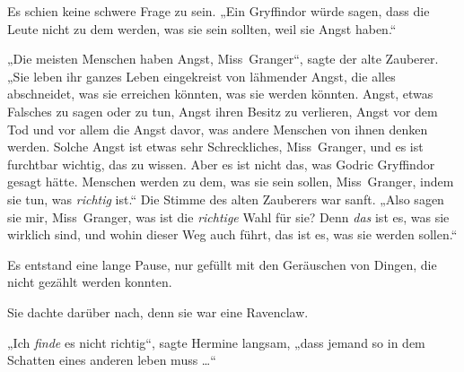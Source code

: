 Es schien keine schwere Frage zu sein.
„Ein Gryffindor würde sagen, dass die Leute nicht zu dem werden, was sie sein sollten, weil sie Angst haben.“

„Die meisten Menschen haben Angst, Miss~Granger“, sagte der alte Zauberer.
„Sie leben ihr ganzes Leben eingekreist von lähmender Angst, die alles abschneidet, was sie erreichen könnten, was sie werden könnten. Angst, etwas Falsches zu sagen oder zu tun, Angst ihren Besitz zu verlieren, Angst vor dem Tod und vor allem die Angst davor, was andere Menschen von ihnen denken werden. Solche Angst ist etwas sehr Schreckliches, Miss~Granger, und es ist furchtbar wichtig, das zu wissen. Aber es ist nicht das, was Godric Gryffindor gesagt hätte. Menschen werden zu dem, was sie sein sollen, Miss~Granger, indem sie tun, was \emph{richtig} ist.“ Die Stimme des alten Zauberers war sanft.
„Also sagen sie mir, Miss~Granger, was ist die \emph{richtige} Wahl für sie? Denn \emph{das} ist es, was sie wirklich sind, und wohin dieser Weg auch führt, das ist es, was sie werden sollen.“

Es entstand eine lange Pause, nur gefüllt mit den Geräuschen von Dingen, die nicht gezählt werden konnten.

Sie dachte darüber nach, denn sie war eine Ravenclaw.

„Ich \emph{finde} es nicht richtig“, sagte Hermine langsam, „dass jemand so in dem Schatten eines anderen leben muss …“

